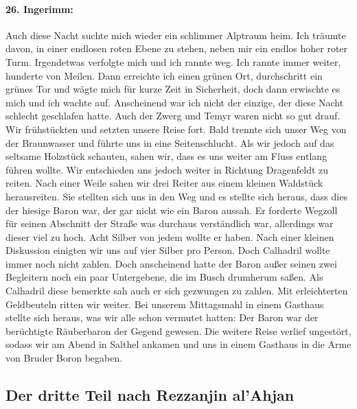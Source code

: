 \paragraph{26. Ingerimm:}
Auch diese Nacht suchte mich wieder ein schlimmer Alptraum heim. Ich träumte davon, in einer endlosen roten Ebene zu stehen, neben mir ein endlos hoher roter Turm. Irgendetwas verfolgte mich und ich rannte weg. Ich rannte immer weiter, hunderte von Meilen. Dann erreichte ich einen grünen Ort, durchschritt ein grünes Tor und wägte mich für kurze Zeit in Sicherheit, doch dann erwischte es mich und ich wachte auf. Anscheinend war ich nicht der einzige, der diese Nacht schlecht geschlafen hatte. Auch der Zwerg und Temyr waren nicht so gut drauf. Wir frühstückten und setzten unsere Reise fort. Bald trennte sich unser Weg von der Braunwasser und führte uns in eine Seitenschlucht. Als wir jedoch auf das seltsame Holzstück schauten, sahen wir, dass es uns weiter am Fluss entlang führen wollte. Wir entschieden uns jedoch weiter in Richtung Dragenfeldt  zu reiten. Nach einer Weile sahen wir drei Reiter aus einem kleinen Waldstück herausreiten. Sie stellten sich uns in den Weg und es stellte sich heraus, dass dies der hiesige Baron war, der gar nicht wie ein Baron aussah. Er forderte Wegzoll für seinen Abschnitt der Straße was durchaus verständlich war, allerdings war dieser viel zu hoch. Acht Silber von jedem wollte er haben. Nach einer kleinen Diskussion einigten wir uns auf vier Silber pro Person. Doch Calhadril wollte immer noch nicht zahlen. Doch anscheinend hatte der Baron außer seinen zwei Begleitern noch ein paar Untergebene, die im Busch drumherum saßen. Als Calhadril diese bemerkte sah auch er sich gezwungen zu zahlen. Mit erleichterten Geldbeuteln ritten wir weiter. Bei unserem Mittagsmahl in einem Gasthaus stellte sich heraus, was wir alle schon vermutet hatten: Der Baron war der berüchtigte Räuberbaron der Gegend gewesen. Die weitere Reise verlief ungestört, sodass wir am Abend in Salthel ankamen und uns in einem Gasthaus in die Arme von Bruder Boron begaben.

\subsection{Der dritte Teil nach Rezzanjin al’Ahjan}

